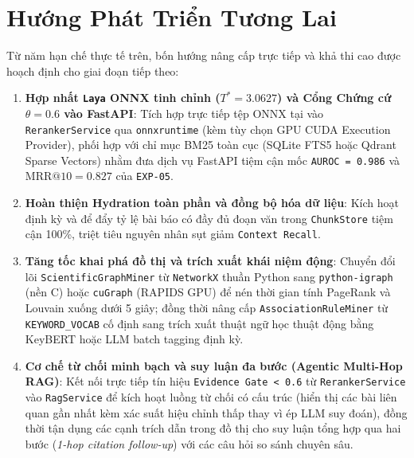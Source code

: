 \section{Hướng Phát Triển Tương Lai}
\label{sec:ch7_future_work}

Từ năm hạn chế thực tế trên, bốn hướng nâng cấp trực tiếp và khả thi cao được hoạch định cho giai đoạn tiếp theo:

\begin{enumerate}[label=\textbf{\arabic*.}]
  \item \textbf{Hợp nhất \texttt{Laya} ONNX tinh chỉnh ($T^* = 3.0627$) và Cổng Chứng cứ $\theta = 0.6$ vào FastAPI}: Tích hợp trực tiếp tệp ONNX tại  vào \texttt{RerankerService} qua \texttt{onnxruntime} (kèm tùy chọn GPU CUDA Execution Provider), phối hợp với chỉ mục BM25 toàn cục (SQLite FTS5 hoặc Qdrant Sparse Vectors) nhằm đưa dịch vụ FastAPI tiệm cận mốc \texttt{AUROC = 0.986} và $\mathrm{MRR}@10 = 0.827$ của \texttt{EXP-05}.

  \item \textbf{Hoàn thiện Hydration toàn phần và đồng bộ hóa dữ liệu}: Kích hoạt định kỳ  và  để đẩy tỷ lệ bài báo có đầy đủ đoạn văn trong \texttt{ChunkStore} tiệm cận 100\%, triệt tiêu nguyên nhân sụt giảm \texttt{Context Recall}.

  \item \textbf{Tăng tốc khai phá đồ thị và trích xuất khái niệm động}: Chuyển đổi lõi \texttt{ScientificGraphMiner} từ \texttt{NetworkX} thuần Python sang \texttt{python-igraph} (nền C) hoặc \texttt{cuGraph} (RAPIDS GPU) để nén thời gian tính PageRank và Louvain xuống dưới 5 giây; đồng thời nâng cấp \texttt{AssociationRuleMiner} từ \texttt{KEYWORD\_VOCAB} cố định sang trích xuất thuật ngữ học thuật động bằng KeyBERT hoặc LLM batch tagging định kỳ.

  \item \textbf{Cơ chế từ chối minh bạch và suy luận đa bước (Agentic Multi-Hop RAG)}: Kết nối trực tiếp tín hiệu \texttt{Evidence Gate < 0.6} từ \texttt{RerankerService} vào \texttt{RagService} để kích hoạt luồng từ chối có cấu trúc (hiển thị các bài liên quan gần nhất kèm xác suất hiệu chỉnh thấp thay vì ép LLM suy đoán), đồng thời tận dụng các cạnh trích dẫn trong đồ thị cho suy luận tổng hợp qua hai bước (\textit{1-hop citation follow-up}) với các câu hỏi so sánh chuyên sâu.
\end{enumerate}
